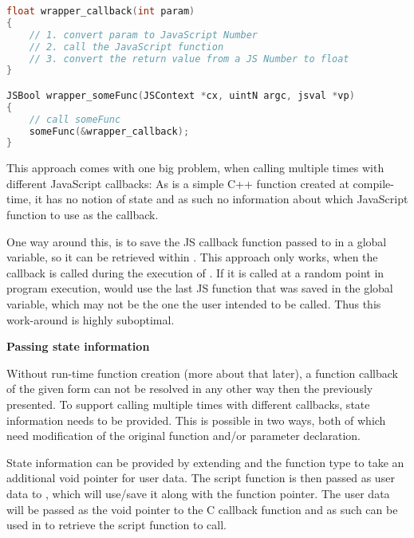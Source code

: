 \SingleSpacing
\begin{lstlisting}[language=C++, caption=Wrapper code for handling methods that take function pointers \#1]
float wrapper_callback(int param)
{
	// 1. convert param to JavaScript Number
	// 2. call the JavaScript function
	// 3. convert the return value from a JS Number to float
}

JSBool wrapper_someFunc(JSContext *cx, uintN argc, jsval *vp)
{
	// call someFunc
	someFunc(&wrapper_callback);
}
\end{lstlisting}
\OnehalfSpacing

This approach comes with one big problem, when calling  multiple times with different JavaScript callbacks: As  is a simple C++ function created at compile-time, it has no notion of state and as such no information about which JavaScript function to use as the callback.

One way around this, is to save the JS callback function passed to  in a global variable, so it can be retrieved within . This approach only works, when the callback is called during the execution of . If it is called at a random point in program execution,  would use the last JS function that was saved in the global variable, which may not be the one the user intended to be called. Thus this work-around is highly suboptimal.

\textbf{Passing state information}

Without run-time function creation (more about that later), a function callback of the given form can not be resolved in any other way then the previously presented. To support calling  multiple times with different callbacks, state information needs to be provided. This is possible in two ways, both of which need modification of the original function and/or parameter declaration.

State information can be provided by extending  and the function type to take an additional void pointer for user data. The script function is then passed as user data to , which will use/save it along with the function pointer. The user data will be passed as the void pointer to the C callback function and as such can be used in  to retrieve the script function to call.

